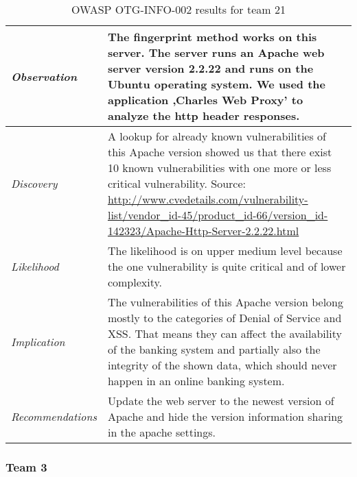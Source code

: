\documentclass[headsepline,footsepline,footinclude=false,oneside,fontsize=11pt,paper=a4,listof=totoc,bibliography=totoc]{scrbook} %
\begin{document}
\begin{table}[H]
\centering
 \begin{tabular}{l p{11cm}} 
 \textit{Observation} & The fingerprint method works on this server. The server runs an Apache web server version 2.2.22 and runs on the Ubuntu operating system. We used the application ‚Charles Web Proxy’ to analyze the http header responses.\\ 
 \hline
 \textit{Discovery} & A lookup for already known vulnerabilities of this Apache version showed us that there exist 10 known vulnerabilities with one more or less critical vulnerability. Source: \url{http://www.cvedetails.com/vulnerability-list/vendor_id-45/product_id-66/version_id-142323/Apache-Http-Server-2.2.22.html}\\
 \hline
 \textit{Likelihood} & The likelihood is on upper medium level because the one vulnerability is quite critical and of lower complexity. \\
 \hline
 \textit{Implication} & The vulnerabilities of this Apache version belong mostly to the categories of Denial of Service and XSS. That means they can affect the availability of the banking system and partially also the integrity of the shown data, which should never happen in an online banking system.\\
 \hline
 \textit{Recommendations} & Update the web server to the newest version of Apache and hide the version information sharing in the apache settings.\\ 
\end{tabular}
\caption{OWASP OTG-INFO-002 results for team 21}
\label{table:scenario2}
\end{table}

\subsubsection{Team 3}
\end{document}

